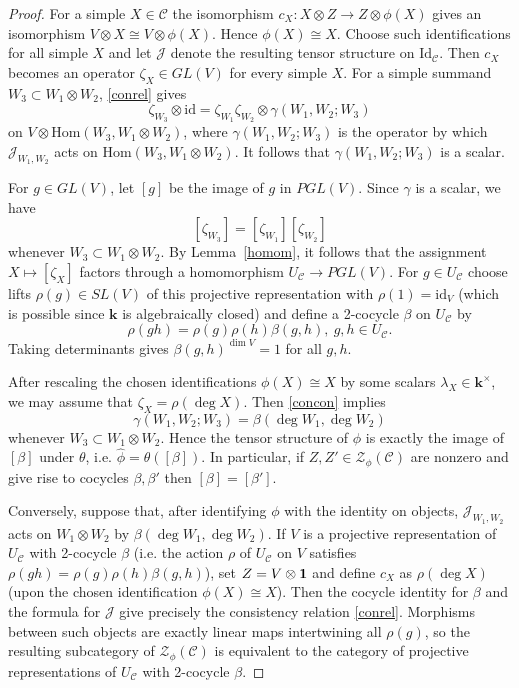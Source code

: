 \documentclass[12pt]{amsart}
\numberwithin{equation}{section}
\theoremstyle{definition}
\newcommand{\id}{\text{id}}
\newcommand{\Hom}{\text{Hom}}
\newcommand{\Id}{\text{Id}}
\newcommand{\1}{_{(1)}}
\newcommand{\2}{_{(2)}}
\newcommand{\3}{_{(3)}}
\newcommand{\4}{_{(4)}}
\newcommand{\5}{_{(5)}}
\newcommand{\6}{_{(6)}}
\newcommand{\C}{\mathcal{C}}
\theoremstyle{plain}
\theoremstyle{definition}
\theoremstyle{remark}
\def\C{\mathcal{C}}
\def\Z{\mathcal{Z}}
\def\Hom{\mathrm{Hom}}
\def\k{\mathbf{k}}
\begin{document}
\begin{proof} For a simple $X\in \C$ the isomorphism 
$c_X:X\otimes Z\to Z\otimes\phi(X)$ 
gives an isomorphism $V\otimes X\cong V\otimes\phi(X)$. Hence $\phi(X)\cong X$.  Choose such identifications for all simple $X$ and let $\mathcal J$ denote the resulting tensor structure on $\Id_\C$.
Then $c_X$ becomes an operator $\zeta_X\in GL(V)$ for every simple $X$.
For a simple summand $W_3\subset W_1\otimes W_2$, \eqref{conrel} gives
\begin{equation}\label{concon}
\zeta_{W_3}\otimes \id=\zeta_{W_1}\zeta_{W_2}\otimes \gamma(W_1,W_2;W_3)
\end{equation}
on $V\otimes \Hom(W_3,W_1\otimes W_2)$, where $\gamma(W_1,W_2;W_3)$ is the operator by which $\mathcal J_{W_1,W_2}$ acts on $\Hom(W_3,W_1\otimes W_2)$.  It follows that $\gamma(W_1,W_2;W_3)$ is a scalar.

For $g\in GL(V)$, let $[g]$ be the image of $g$ in $PGL(V)$. Since $\gamma$ is a scalar, we have 
\[
[\zeta_{W_3}]=[\zeta_{W_1}][\zeta_{W_2}]
\]
whenever $W_3\subset W_1\otimes W_2$. By Lemma~\ref{homom}, it follows that the assignment $X\mapsto[\zeta_X]$ factors through a homomorphism $U_\C\to PGL(V)$.  For $g\in U_\C$ choose lifts $\rho(g)\in SL(V)$ of this projective representation with $\rho(1)=\id_V$ (which is possible since $\k$ is algebraically closed) and define a 2-cocycle $\beta$ on $U_\C$ by
\[
\rho(gh)=\rho(g)\rho(h)\beta(g,h),\ g,h\in U_\C.
\]
Taking determinants gives $\beta(g,h)^{\dim V}=1$ for all $g,h$.

After rescaling the chosen identifications $\phi(X)\cong X$ by some scalars $\lambda_X\in \k^\times$, we may assume that $\zeta_X=\rho(\deg X)$.
Then \eqref{concon} implies
\[
\gamma(W_1,W_2;W_3)=\beta(\deg W_1,\deg W_2)
\]
whenever $W_3\subset W_1\otimes W_2$.  Hence the tensor structure of $\phi$ is exactly the image of $[\beta]$ under $\theta$, i.e. $\widehat\phi=\theta([\beta])$. In particular, if $Z,Z'\in \mathcal Z_\phi(\C)$ 
are nonzero and give rise to cocycles $\beta,\beta'$ then $[\beta]=[\beta']$. 

Conversely, suppose that, after identifying $\phi$ with the identity on objects, $\mathcal J_{W_1,W_2}$ acts on $W_1\otimes W_2$ by $\beta(\deg W_1,\deg W_2)$.  If $V$ is a projective representation of $U_\C$ with 2-cocycle $\beta$ (i.e. the action $\rho$ of $U_\C$ on $V$ satisfies $\rho(gh)=\rho(g)\rho(h)\beta(g,h)$), set $Z=V\otimes\bold 1$ and define $c_X$ as $\rho(\deg X)$ (upon the chosen identification $\phi(X)\cong X$).  Then the cocycle identity for $\beta$ and the formula for $\mathcal J$ give precisely the consistency relation \eqref{conrel}.  Morphisms between such objects are exactly linear maps intertwining all $\rho(g)$, so the resulting subcategory of $\Z_\phi(\C)$ is equivalent to the category of projective representations of $U_\C$ with 2-cocycle $\beta$.
\end{proof}
\end{document}
